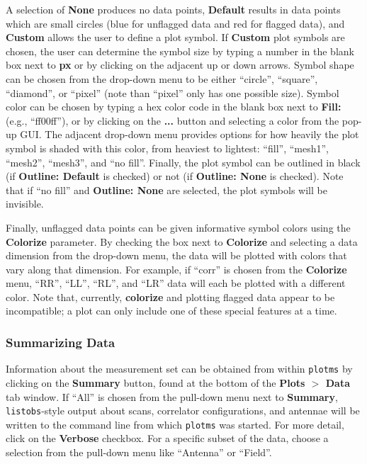 A selection of {\bf None} produces no data points, {\bf Default} results in data points which are small circles (blue for unflagged data and red for flagged data), and {\bf Custom} allows the user to define a plot symbol. If {\bf Custom} plot symbols are chosen, the user can determine the symbol size by typing a number in the blank box next to {\bf px} or by clicking on the adjacent up or down arrows. Symbol shape can be chosen from the drop-down menu to be either ``circle'', ``square'', ``diamond'', or ``pixel'' (note than ``pixel'' only has one possible size). Symbol color can be chosen by typing a hex color code in the blank box next to {\bf Fill:} (e.g., ``ff00ff''), or by clicking on the {\bf ...} button and selecting a color from the pop-up GUI. The adjacent drop-down menu provides options for how heavily the plot symbol is shaded with this color, from heaviest to lightest: ``fill'', ``mesh1'', ``mesh2'', ``mesh3'', and ``no fill''. Finally, the plot symbol can be outlined in black (if {\bf Outline: Default} is checked) or not (if {\bf Outline: None} is checked). Note that if ``no fill'' and {\bf Outline: None} are selected, the plot symbols will be invisible.

Finally, unflagged data points can be given informative symbol colors using the {\bf Colorize} parameter. By checking the box next to {\bf Colorize} and selecting a data dimension from the drop-down menu, the data will be plotted with colors that vary along that dimension. For example, if ``corr'' is chosen from the {\bf Colorize} menu, ``RR'', ``LL'', ``RL'', and ``LR'' data will each be plotted with a different color. Note that, currently, {\bf colorize} and plotting flagged data appear to be incompatible; a plot can only include one of these special features at a time.


\subsubsection{Summarizing Data}
\label{section:edit.plot.plotms.summary}

Information about the measurement set can be obtained from within {\tt plotms} by clicking on the {\bf Summary} button, found at the bottom of the {\bf Plots $>$ Data} tab window. If ``All'' is chosen from the pull-down menu next to {\bf Summary}, {\tt listobs}-style output about scans, correlator configurations, and antennae will be written to the command line from which {\tt plotms} was started. For more detail, click on the {\bf Verbose} checkbox. For a specific subset of the data, choose a selection from the pull-down menu like ``Antenna'' or ``Field''.

